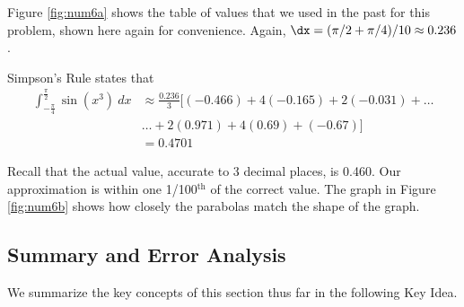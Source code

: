 {Figure \ref{fig:num6a} shows the table of values that we used in the past for this problem, shown here again for convenience. Again, $\dx = (\pi/2+\pi/4)/10 \approx 0.236$.

Simpson's Rule states that 
\small\begin{align*}\int_{-\frac{\pi}4}^{\frac{\pi}2} \sin (x^3)\ dx &\approx \frac{0.236}3\Big[(-0.466)+4(-0.165)+2(-0.031) + \ldots \\
			& \ldots + 2(0.971) + 4(0.69) + (-0.67)\Big]\\
		&= 0.4701
\end{align*}\normalsize


Recall that the actual value, accurate to 3 decimal places, is 0.460. Our approximation is within one 1/100$^\text{th}$ of the correct value. The graph in Figure \ref{fig:num6b} shows how closely the parabolas match the shape of the graph.}

\subsection*{Summary and Error Analysis}

We summarize the key concepts of this section thus far in the following Key Idea.

